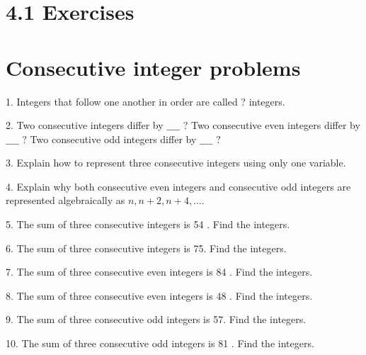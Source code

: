 \documentclass{ximera}
\begin{document}
\section*{4.1 Exercises}
\section*{Consecutive integer problems}

\begin{exercise}
1. Integers that follow one another in order are called ? integers.
\end{exercise}

\begin{exercise}
2. Two consecutive integers differ by $\_\_\_\_$ ? Two consecutive even integers differ by $\_\_\_\_$ ? Two consecutive odd integers differ by $\_\_\_\_$ $?$
\end{exercise}

\begin{exercise}
3. Explain how to represent three consecutive integers using only one variable.
\end{exercise}

\begin{exercise}
4. Explain why both consecutive even integers and consecutive odd integers are represented algebraically as $n, n+2, n+4, \ldots$.
\end{exercise}

\begin{exercise}
5. The sum of three consecutive integers is 54 . Find the integers.
\end{exercise}

\begin{exercise}
6. The sum of three consecutive integers is 75. Find the integers.
\end{exercise}

\begin{exercise}
7. The sum of three consecutive even integers is 84 . Find the integers.
\end{exercise}

\begin{exercise}
8. The sum of three consecutive even integers is 48 . Find the integers.
\end{exercise}

\begin{exercise}
9. The sum of three consecutive odd integers is 57. Find the integers.
\end{exercise}

\begin{exercise}
10. The sum of three consecutive odd integers is 81 . Find the integers.
\end{exercise}
\end{document}
